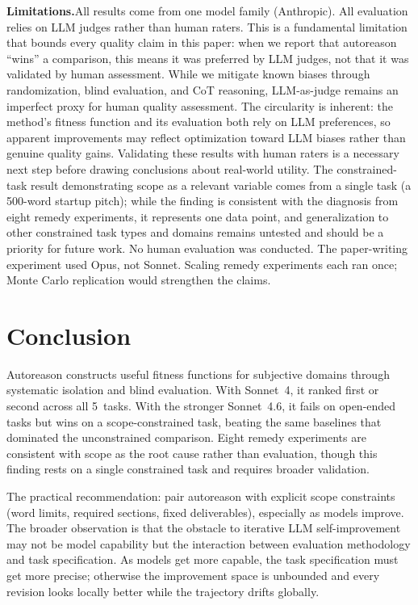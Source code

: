 \documentclass[10pt,twocolumn]{article}
\begin{document}
\textbf{Limitations.}\enspace All results come from one model family (Anthropic). All evaluation relies on LLM judges rather than human raters. This is a fundamental limitation that bounds every quality claim in this paper: when we report that autoreason ``wins'' a comparison, this means it was preferred by LLM judges, not that it was validated by human assessment. While we mitigate known biases through randomization, blind evaluation, and CoT reasoning, LLM-as-judge remains an imperfect proxy for human quality assessment. The circularity is inherent: the method's fitness function and its evaluation both rely on LLM preferences, so apparent improvements may reflect optimization toward LLM biases rather than genuine quality gains. Validating these results with human raters is a necessary next step before drawing conclusions about real-world utility. The constrained-task result demonstrating scope as a relevant variable comes from a single task (a 500-word startup pitch); while the finding is consistent with the diagnosis from eight remedy experiments, it represents one data point, and generalization to other constrained task types and domains remains untested and should be a priority for future work. No human evaluation was conducted. The paper-writing experiment used Opus, not Sonnet. Scaling remedy experiments each ran once; Monte Carlo replication would strengthen the claims.

\section{Conclusion}

Autoreason constructs useful fitness functions for subjective domains through systematic isolation and blind evaluation. With Sonnet~4, it ranked first or second across all 5~tasks. With the stronger Sonnet~4.6, it fails on open-ended tasks but wins on a scope-constrained task, beating the same baselines that dominated the unconstrained comparison. Eight remedy experiments are consistent with scope as the root cause rather than evaluation, though this finding rests on a single constrained task and requires broader validation.

The practical recommendation: pair autoreason with explicit scope constraints (word limits, required sections, fixed deliverables), especially as models improve. The broader observation is that the obstacle to iterative LLM self-improvement may not be model capability but the interaction between evaluation methodology and task specification. As models get more capable, the task specification must get more precise; otherwise the improvement space is unbounded and every revision looks locally better while the trajectory drifts globally.
\end{document}
